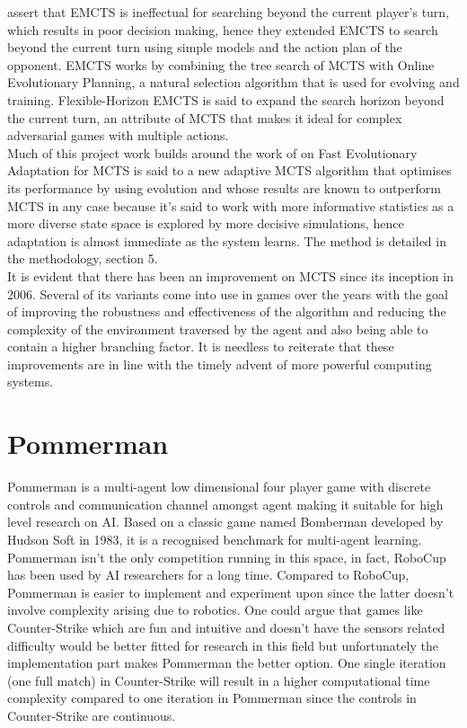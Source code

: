 \documentclass{llncs}
\begin{document}
 \noindent
\cite{baier2018evolutionary} assert that EMCTS is ineffectual for searching beyond the current player’s turn, which results in poor decision making, hence they extended EMCTS to search beyond the current turn using simple models and the action plan of the opponent. EMCTS works by combining the tree search of MCTS with Online Evolutionary Planning, a natural selection algorithm that is used for evolving and training. Flexible-Horizon EMCTS is said to expand the search horizon beyond the current turn, an attribute of MCTS that makes it ideal for complex adversarial games with multiple actions.\\

\noindent
Much of this project work builds around the work of \cite{lucas2014fast} on Fast Evolutionary Adaptation for MCTS is said to a new adaptive MCTS algorithm
that optimises its performance by using evolution and whose results are known to outperform MCTS in any case because it’s said to work with more informative statistics as a more diverse state space is explored by more decisive simulations, hence adaptation is almost immediate as the system learns. The method is detailed in the methodology, section 5. \\

\noindent
It is evident that there has been an improvement on MCTS since its inception in 2006. Several of its variants come into use in games over the years with the goal of improving the robustness and effectiveness of the algorithm and reducing the complexity of the environment traversed by the agent and also being able to contain a higher branching factor. It is needless to reiterate that these improvements are in line with the timely advent of more powerful computing systems. 


\section{Pommerman} \label{sec:bench}

Pommerman \cite{resnick2018pommerman} is a multi-agent low dimensional four player game with discrete controls and communication channel amongst agent making it suitable for high level research on AI. Based on a classic game named Bomberman \cite{wikipedia_2021} developed by Hudson Soft in 1983, it is a recognised benchmark for multi-agent learning. Pommerman isn't the only competition running in this space, in fact, RoboCup \cite{kitano1997robocup} \cite{nardi2014robocup} has been used by AI researchers for a long time. Compared to RoboCup, Pommerman is easier to implement and experiment upon since the latter doesn't involve complexity arising due to robotics. One could argue that games like Counter-Strike which are fun and intuitive and doesn't have the sensors related difficulty would be better fitted for research in this field but unfortunately the implementation part makes Pommerman the better option. One single iteration (one full match) in Counter-Strike will result in a higher computational time complexity compared to one iteration in Pommerman since the controls in Counter-Strike are continuous. 
\end{document}
